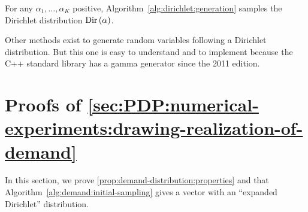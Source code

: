 \begin{prop}\label{prop:appendix:dirichlet-generation}
For any $\alpha_1,\ldots,\alpha_K$ positive, Algorithm~\ref{alg:dirichlet:generation} samples the Dirichlet distribution $\Dir\bracket{\alpha}$.
\end{prop}






Other methods exist to generate random variables following a Dirichlet distribution.
But this one is easy to understand and to implement because the C++ standard library has a gamma generator since the 2011 edition.


\section{Proofs of \cref{sec:PDP:numerical-experiments:drawing-realization-of-demand}}
\label{sec:PDP:numerical-experiments:instances:proofs}


In this section, we prove \cref{prop:demand-distribution:properties} and that Algorithm~\ref{alg:demand:initial-sampling} gives a vector with an ``expanded Dirichlet'' distribution.


